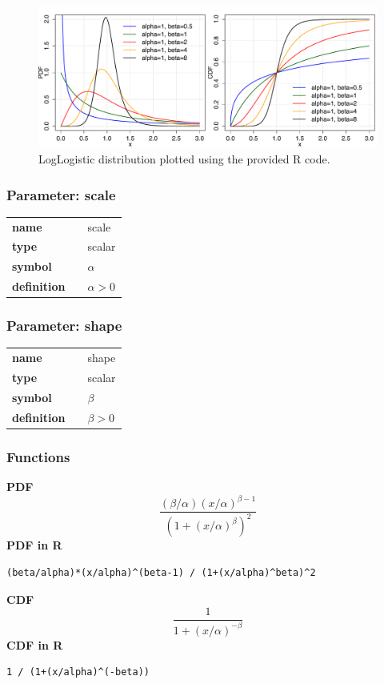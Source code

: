 \begin{figure}[ht!]
\centering
  \includegraphics[width=140mm]{pics/LogLogistic.pdf}
 \caption{LogLogistic distribution plotted using the provided R code.}
 \label{fig:LogLogistic}
\end{figure}

\subsubsection*{Parameter: scale}

\noindent\begin{tabular}{p{2cm}cl}
\textbf{name} & & scale \\
\textbf{type} & & scalar \\
\textbf{symbol} & & $\alpha$  \\
\textbf{definition} & & $\alpha > 0$
\end{tabular}
\subsubsection*{Parameter: shape}

\noindent\begin{tabular}{p{2cm}cl}
\textbf{name} & & shape \\
\textbf{type} & & scalar \\
\textbf{symbol} & & $\beta$  \\
\textbf{definition} & & $\beta > 0$
\end{tabular}
\subsubsection*{Functions}

\smallskip \noindent \hspace{.2cm} \textbf{PDF} 
\begin{equation*}\frac{(\beta/\alpha)(x/\alpha)^{\beta-1}}{(1+(x/\alpha)^\beta)^2}\end{equation*}
\smallskip \noindent \hspace{.2cm} \textbf{PDF in R}  
\begin{verbatim}(beta/alpha)*(x/alpha)^(beta-1) / (1+(x/alpha)^beta)^2\end{verbatim}
\smallskip \noindent \hspace{.2cm} \textbf{CDF} 
\begin{equation*}\frac{1}{1+(x/\alpha)^{-\beta}}\end{equation*}
\smallskip \noindent \hspace{.2cm} \textbf{CDF in R} 
\begin{verbatim}1 / (1+(x/alpha)^(-beta))\end{verbatim}
\smallskip
